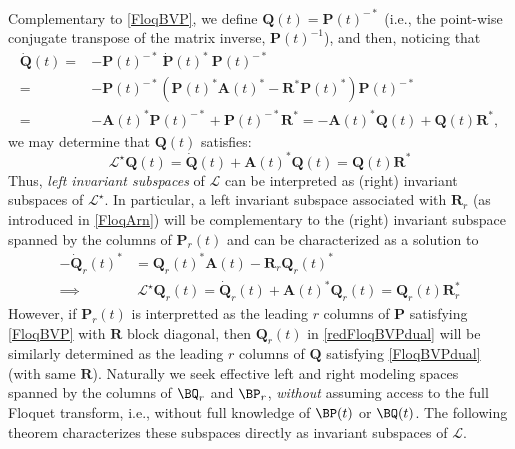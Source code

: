 \documentclass[pdflatex,sn-mathphys-num]{sn-jnl}%
\theoremstyle{thmstyleone}%
\theoremstyle{thmstyletwo}%
\theoremstyle{thmstylethree}%
\def\Lop{\mathscr{L}}
\begin{document}
Complementary to \eqref{FloqBVP}, we define $\mathbf{Q}(t)=\mathbf{P}(t)^{-*}$ (i.e., the point-wise conjugate transpose of the matrix inverse, $\mathbf{P}(t)^{-1}$), and then, noticing that 
\begin{align*}
  \dot{\mathbf{Q}}(t)=&-\mathbf{P}(t)^{-*}\ \dot{\mathbf{P}}(t)^*\ \mathbf{P}(t)^{-*} \\
=& -\mathbf{P}(t)^{-*}(\mathbf{P}(t)^*\mathbf{A}(t)^* -\mathbf{R}^*\mathbf{P}(t)^*)\mathbf{P}(t)^{-*}\\
=& -\mathbf{A}(t)^*\mathbf{P}(t)^{-*} +\mathbf{P}(t)^{-*}\mathbf{R}^{*}
=-\mathbf{A}(t)^*\mathbf{Q}(t) +\mathbf{Q}(t)\mathbf{R}^*,
\end{align*}
we may determine that $\mathbf{Q}(t)$ satisfies:
\begin{equation} \label{FloqBVPdual}
\mathscr{L}^{\star}\mathbf{Q}(t)=\dot{\mathbf{Q}}(t) +\mathbf{A}(t)^*\mathbf{Q}(t) =\mathbf{Q}(t)\mathbf{R}^{*} 
\end{equation}
Thus, \emph{left invariant subspaces} of $\mathscr{L}$ can be  interpreted as (right) invariant subspaces of $\mathscr{L}^{\star}$. 
In particular, a left invariant subspace associated with $\mathbf{R}_{r}$ (as introduced in \eqref{FloqArn})
will be complementary to the (right) invariant subspace spanned by the columns of $\mathbf{P}_r(t)$ and can be characterized as a solution to 
\begin{equation} \label{redFloqBVPdual}
\begin{aligned}
    -\dot{\mathbf{Q}}_r(t)^{*} &= \mathbf{Q}_r(t)^{*}\mathbf{A}(t) -\mathbf{R}_{r}\mathbf{Q}_r(t)^{*}\\
    \implies &\ 
\mathscr{L}^{\star}\mathbf{Q}_r(t)=\dot{\mathbf{Q}}_r(t) +\mathbf{A}(t)^*\mathbf{Q}_r(t) =\mathbf{Q}_r(t)\mathbf{R}_{r}^{*} 
\end{aligned}
\end{equation}
However, if $\mathbf{P}_r(t)$ is interpretted as the leading $r$ columns of $\mathbf{P}$ satisfying \eqref{FloqBVP} with $\mathbf{R}$ block diagonal, then $\mathbf{Q}_r(t)$ in \eqref{redFloqBVPdual} will be similarly determined as the leading $r$ columns of $\mathbf{Q}$ satisfying \eqref{FloqBVPdual} (with same $\mathbf{R}$).  
Naturally we seek effective left and right modeling spaces spanned by the columns of $\BQ_r$ and $\BP_r$, \emph{without} assuming access to the full Floquet transform, i.e., without full knowledge of $\BP(t)$ or $\BQ(t)$. The following theorem characterizes these subspaces directly as invariant subspaces of $\Lop$. 
\end{document}
